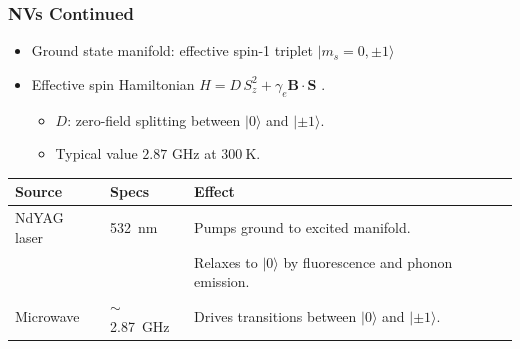 \documentclass{beamer}
\begin{document}
\begin{frame}
    \frametitle{NVs Continued} 
    \begin{itemize}
        \item Ground state manifold: effective spin-1 triplet $|m_s=0, \pm 1\rangle$
        \item Effective spin Hamiltonian $H = D\, S_z^2 + \gamma_e {\mathbf{B}} \cdot {\mathbf{S}}$ \cite{Prasad2018NVNotes}. 
        \begin{itemize}
            \item $D$: zero-field splitting between $|0\rangle$ and $|\pm 1\rangle$. 
            \item Typical value $2.87$ GHz at $\SI{300}{\kelvin}$. 
        \end{itemize}
    \end{itemize}
    \begin{table}
        \centering
        {\small %
        \begin{tabular}{ll>{\scriptsize}l} %
            \toprule
            Source & Specs & Effect \\
            \midrule
            NdYAG laser & \SI{532}{\nano\meter} & 
            Pumps ground to excited manifold. \\ 
             & & Relaxes to $|0\rangle$ by fluorescence and phonon emission. \\
            Microwave & $\sim$\SI{2.87}{\giga\hertz} & Drives transitions between $|0\rangle$ and $|\pm 1\rangle$. \\
            \bottomrule
        \end{tabular}
        } %
        \label{tab:radiation_effects}
    \end{table}

\end{frame}
\end{document}
